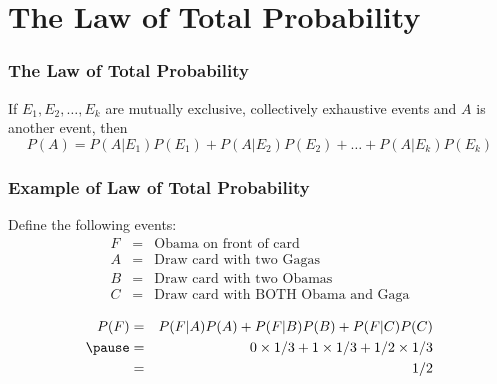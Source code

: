 \documentclass{beamer}
\begin{document}
\section{The Law of Total Probability}
\begin{frame}
\frametitle{The Law of Total Probability}
If $E_1, E_2, \hdots, E_k$ are mutually exclusive, collectively exhaustive events and $A$ is another event, then
	$$P(A) = P(A|E_1)P(E_1) + P(A|E_2)P(E_2) + \hdots + P(A|E_k)P(E_k)$$

\end{frame}

\begin{frame}
  \frametitle{Example of Law of Total Probability}
  Define the following events:
  \begin{eqnarray*}
    F &=&  \mbox{Obama on front of card}\\
    A &=&  \mbox{Draw card with two Gagas}\\
    B &=&  \mbox{Draw card with two Obamas}\\
    C &=&  \mbox{Draw card with BOTH Obama and Gaga}\\
  \end{eqnarray*}
  \begin{eqnarray*}
  P(F) &=& P(F|A)P(A) + P(F|B)P(B) + P(F|C)P(C) \\ \pause
  &=& 0 \times 1/3 + 1 \times 1/3 + 1/2 \times 1/3 \\
  &=& 1/2
  \end{eqnarray*}

\end{frame}
\def\EventA{(-0.35,0) circle (1.2)}
\def\EventB{(1.35,0) circle (1.2)}
\def\EventC{(-0.35,0) circle (0.6)}
\def\EventD{(0,0) circle (1.6)}
\def\SampleSpace{(-2,-2) rectangle (3,2)}
\end{document}
